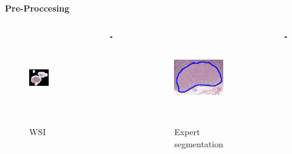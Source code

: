 \documentclass[usenames,dvipsnames]{beamer}
\begin{document}
\begin{frame}{\textbf{Pre-Proccesing}}
\begin{columns}
   \begin{figure}
    \centering
    \includegraphics[height=4cm,width=4cm]{imagmetodo/WSItotal.PNG}
    \caption*{\large WSI}
    \end{figure}
    
     \begin{figure}
         \centering
         \includegraphics[height=0.5cm,width=0.5cm]{imagenes3/flecha.png}
         \end{figure}
         
         \begin{figure}
             \centering
             \includegraphics[height=4cm,width=4cm]{imagmetodo/segmentidentify.PNG}
             \caption*{\large Expert segmentation}
         \end{figure}
         
     \begin{figure}
         \centering
         \includegraphics[height=0.5cm,width=0.5cm]{imagenes3/flecha.png}
         \end{figure}
         

\end{columns}
\end{frame}
\end{document}
